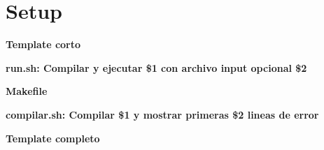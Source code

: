 \section{Setup}
    \textbf{Template corto}
    

    \textbf{run.sh: Compilar y ejecutar \$1 con archivo input opcional \$2}
    
    
    \textbf{Makefile}
    
    
    \textbf{compilar.sh: Compilar \$1 y mostrar primeras \$2 lineas de error}
    

    \textbf{Template completo}
    